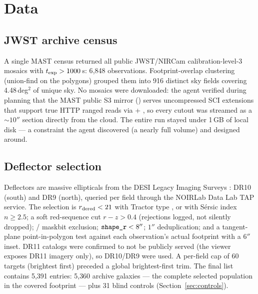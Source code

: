 \documentclass[11pt,letterpaper]{article}
\newcommand{\numtargets}{5{,}391}
\begin{document}
\section{Data}\label{sec:data}

\subsection{JWST archive census}\label{sec:census}

A single MAST  census returned all public JWST/NIRCam
calibration-level-3  mosaics with $t_{\rm exp}>1000$\,s: 6{,}848
observations. Footprint-overlap clustering (union-find on the 
polygons) grouped them into 916 distinct sky fields covering 4.48\,deg$^2$ of
unique sky. No mosaics were downloaded: the agent verified during planning
that the MAST public S3 mirror () serves uncompressed SCI
extensions that support true HTTP ranged reads via
 + , so every cutout was streamed as a
$\sim$$10''$ section directly from the cloud. The entire run stayed under
1\,GB of local disk --- a constraint the agent discovered (a nearly full
volume) and designed around.

\subsection{Deflector selection}\label{sec:deflectors}

Deflectors are massive ellipticals from the DESI Legacy Imaging Surveys
\citep{dey2019overview}: DR10 (south) and DR9 (north), queried per field
through the NOIRLab Data Lab TAP service. The selection is
$r_{\rm dered}<21$ with Tractor type , or  with S\'ersic
index $n\geq2.5$; a soft red-sequence cut $r-z>0.4$ (rejections logged, not
silently dropped); / maskbit exclusion;
$\texttt{shape\_r}<8''$; $1''$ deduplication; and a tangent-plane
point-in-polygon test against each observation's actual footprint with a
$6''$ inset. DR11 catalogs were confirmed to not be publicly served (the
viewer exposes DR11 imagery only), so DR10/DR9 were used. A per-field cap of
60 targets (brightest first) preceded a global brightest-first trim. The final
list contains \numtargets{} entries: 5{,}360 archive galaxies --- the complete
selected population in the covered footprint --- plus 31 blind controls
(Section~\ref{sec:controls}).
\end{document}

